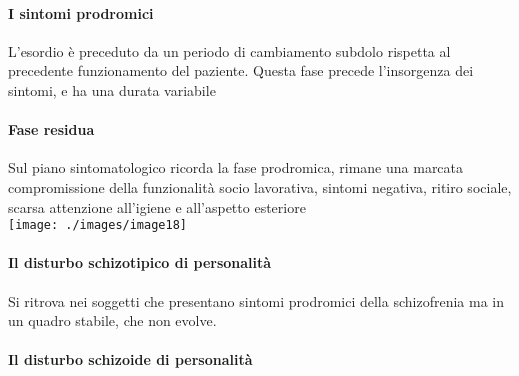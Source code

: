 \paragraph{I sintomi prodromici}  L'esordio è preceduto da un periodo di cambiamento subdolo rispetta al precedente funzionamento del paziente. Questa fase precede l'insorgenza dei sintomi, e ha una durata variabile
\paragraph{Fase residua}  Sul piano sintomatologico ricorda la fase prodromica, rimane una marcata compromissione della funzionalità socio lavorativa, sintomi negativa, ritiro sociale, scarsa attenzione all'igiene e all'aspetto esteriore 
\medskip\\
\texttt{[image: ./images/image18]}
\medskip\\
\paragraph{Il disturbo schizotipico di personalità} Si ritrova nei soggetti che presentano sintomi prodromici della schizofrenia ma in un quadro stabile, che non evolve.
\paragraph{Il disturbo schizoide di personalità}   
